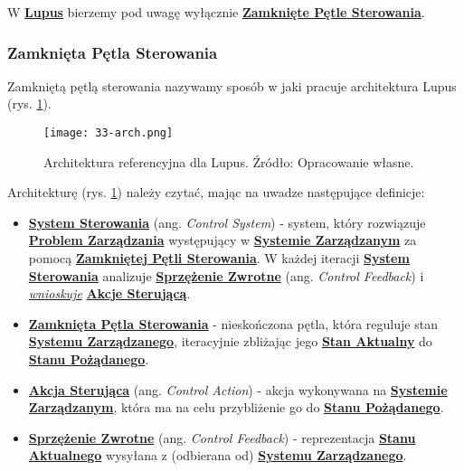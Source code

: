 W \hyperlink{def:lupus}{\textbf{Lupus}} bierzemy pod uwagę wyłącznie \hyperlink{def:zamknieta-petla-sterowania}{\textbf{Zamknięte Pętle Sterowania}}.

\subsubsection{Zamknięta Pętla Sterowania}
Zamkniętą pętlą sterowania nazywamy sposób w jaki pracuje architektura Lupus (rys. \ref{fig:33-arch}).

\begin{figure}[!h]
    \centering \texttt{[image: 33-arch.png]}
    \caption{Architektura referencyjna dla Lupus. Źródło: Opracowanie własne.}\label{fig:33-arch}
\end{figure}

Architekturę (rys. \ref{fig:33-arch}) należy czytać, mając na uwadze następujące definicje:

\begin{itemize}
    \item \hyperlink{def:system-sterowania}{\textbf{System Sterowania}} (ang. \textit{Control System}) - system, który rozwiązuje \hyperlink{def:problem-zarzadzania}{\textbf{Problem Zarządzania}} występujący w \hyperlink{def:system-zarzadzany}{\textbf{Systemie Zarządzanym}} za pomocą \hyperlink{def:zamknieta-petla-sterowania}{\textbf{Zamkniętej Pętli Sterowania}}. W każdej iteracji \hyperlink{def:system-sterowania}{\textbf{System Sterowania}} analizuje \hyperlink{def:sprzezenie-zwrotne}{\textbf{Sprzężenie Zwrotne}} (ang. \textit{Control Feedback}) i \hyperlink{def:wnioskowanie}{\textit{wnioskuje}} \hyperlink{def:akcja-sterujaca}{\textbf{Akcje Sterującą}}.
    \item \hyperlink{def:zamknieta-petla-sterowania}{\textbf{Zamknięta Pętla Sterowania}} - nieskończona pętla, która reguluje stan \hyperlink{def:system-zarzadzany}{\textbf{Systemu Zarządzanego}}, iteracyjnie zbliżając jego \hyperlink{def:stan-aktualny}{\textbf{Stan Aktualny}} do \hyperlink{def:stan-pozadany}{\textbf{Stanu Pożądanego}}. 
    \item \hyperlink{def:akcja-sterujaca}{\textbf{Akcja Sterująca}} (ang. \textit{Control Action}) - akcja wykonywana na \hyperlink{def:system-zarzadzany}{\textbf{Systemie Zarządzanym}}, która ma na celu przybliżenie go do \hyperlink{def:stan-pozadany}{\textbf{Stanu Pożądanego}}.
    \item \hyperlink{def:sprzezenie-zwrotne}{\textbf{Sprzężenie Zwrotne}} (ang. \textit{Control Feedback}) - reprezentacja \hyperlink{def:stan-aktualny}{\textbf{Stanu Aktualnego}} wysyłana z (odbierana od) \hyperlink{def:system-zarzadzany}{\textbf{Systemu Zarządzanego}}.
\end{itemize}

